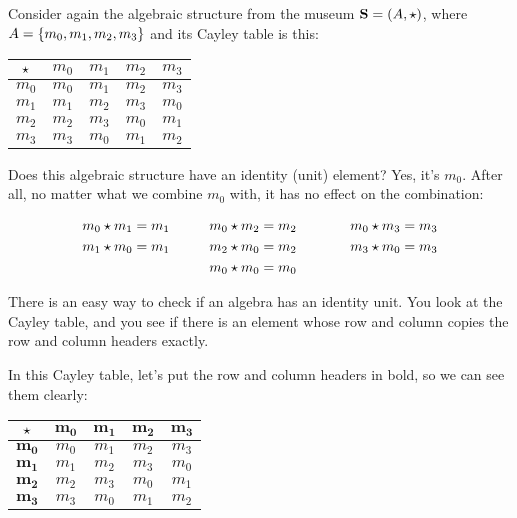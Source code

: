 \documentclass[../../../main.tex]{subfiles}
\begin{document}
\begin{fexample}

Consider again the algebraic structure from the museum $\algebra{S} = (\set{A}, \opSymbol/)$, where $A = \{ m_{0}, m_{1}, m_{2}, m_{3} \}$ and its Cayley table is this:

\begin{center}
  \begin{tabular}{| c || c | c | c | c |}
    \hline
    $\opSymbol/$ & $m_{0}$ & $m_{1}$ & $m_{2}$ & $m_{3}$ \\ \hline \hline
    $m_{0}$      & $m_{0}$ & $m_{1}$ & $m_{2}$ & $m_{3}$ \\ \hline
    $m_{1}$      & $m_{1}$ & $m_{2}$ & $m_{3}$ & $m_{0}$ \\ \hline
    $m_{2}$      & $m_{2}$ & $m_{3}$ & $m_{0}$ & $m_{1}$ \\ \hline
    $m_{3}$      & $m_{3}$ & $m_{0}$ & $m_{1}$ & $m_{2}$ \\ \hline
  \end{tabular}
\end{center}

Does this algebraic structure have an identity (unit) element? Yes, it's $m_{0}$. After all, no matter what we combine $m_{0}$ with, it has no effect on the combination:

\begin{alignat*}{3}
  \op{m_{0}}{m_{1}} = m_{1} & \hskip 1cm 
  \op{m_{0}}{m_{2}} = m_{2} & \hskip 1cm 
  \op{m_{0}}{m_{3}} = m_{3} \\
  \op{m_{1}}{m_{0}} = m_{1} & \hskip 1cm 
  \op{m_{2}}{m_{0}} = m_{2} & \hskip 1cm 
  \op{m_{3}}{m_{0}} = m_{3} \\
  & \hskip 1cm \op{m_{0}}{m_{0}} = m_{0} &
\end{alignat*}

There is an easy way to check if an algebra has an identity unit. You look at the Cayley table, and you see if there is an element whose row and column copies the row and column headers exactly. 

In this Cayley table, let's put the row and column headers in bold, so we can see them clearly:

\begin{center}
  \begin{tabular}{| c || c | c | c | c |}
    \hline
    $\opSymbol/$ & $\mathbf{m_{0}}$ & $\mathbf{m_{1}}$ & $\mathbf{m_{2}}$ & $\mathbf{m_{3}}$ \\ \hline \hline
    $\mathbf{m_{0}}$      & $m_{0}$ & $m_{1}$ & $m_{2}$ & $m_{3}$ \\ \hline
    $\mathbf{m_{1}}$      & $m_{1}$ & $m_{2}$ & $m_{3}$ & $m_{0}$ \\ \hline
    $\mathbf{m_{2}}$      & $m_{2}$ & $m_{3}$ & $m_{0}$ & $m_{1}$ \\ \hline
    $\mathbf{m_{3}}$      & $m_{3}$ & $m_{0}$ & $m_{1}$ & $m_{2}$ \\ \hline
  \end{tabular}
\end{center}


\end{fexample}
\end{document}
